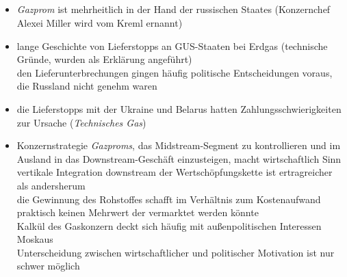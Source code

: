 \documentclass[11pt,a4paper]{article}
\begin{document}
\subsection*{}


\begin{itemize}

\item \textsl{Gazprom} ist mehrheitlich in der Hand der russischen Staates (Konzernchef Alexei Miller wird vom Kreml ernannt)

\item lange Geschichte von Lieferstopps an GUS-Staaten bei Erdgas (technische Gründe, wurden als Erklärung angeführt)\\
 den Lieferunterbrechungen gingen häufig politische Entscheidungen voraus, die Russland nicht genehm waren


\item die Lieferstopps mit der Ukraine und Belarus hatten Zahlungsschwierigkeiten zur Ursache (\textsl{Technisches Gas})


\item Konzernstrategie \textsl{Gazproms}, das Midstream-Segment zu kontrollieren und im Ausland in das Downstream-Geschäft einzusteigen, macht wirtschaftlich Sinn\\
 vertikale Integration downstream der Wertschöpfungskette ist ertragreicher als andersherum\\
 die Gewinnung des Rohstoffes schafft im Verhältnis zum Kostenaufwand praktisch keinen Mehrwert der vermarktet werden könnte\\
 Kalkül des Gaskonzern deckt sich häufig mit außenpolitischen Interessen Moskaus\\
 Unterscheidung zwischen wirtschaftlicher und politischer Motivation ist nur schwer möglich

\end{itemize}



\subsection*{}
\end{document}

